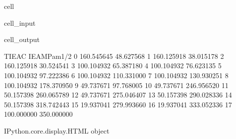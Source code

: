 \documentclass[letterpaper,10pt,english]{jupyterBook}
\begin{document}
\begin{sphinxuseclass}{cell}
\begin{sphinxVerbatimInput}
\begin{sphinxuseclass}{cell_input}
		\end{sphinxuseclass}\end{sphinxVerbatimInput}
		\begin{sphinxVerbatimOutput}
			
			\begin{sphinxuseclass}{cell_output}
				\begin{sphinxVerbatim}[commandchars=\\\{\}]
					T\PYGZus{}IEAC  IEAMPam\PYGZca{}1/2
					0  \PYGZhy{}160.545645    48.627568
					1  \PYGZhy{}160.125918    38.015178
					2  \PYGZhy{}160.125918    30.524541
					3  \PYGZhy{}100.104932    65.387180
					4  \PYGZhy{}100.104932    76.623135
					5  \PYGZhy{}100.104932    97.222386
					6  \PYGZhy{}100.104932   110.331000
					7  \PYGZhy{}100.104932   130.930251
					8  \PYGZhy{}100.104932   178.370950
					9   \PYGZhy{}49.737671    97.768005
					10  \PYGZhy{}49.737671   246.956520
					11  \PYGZhy{}50.157398   260.065789
					12  \PYGZhy{}49.737671   275.046407
					13  \PYGZhy{}50.157398   290.028336
					14  \PYGZhy{}50.157398   318.742443
					15  \PYGZhy{}19.937041   279.993660
					16  \PYGZhy{}19.937041   333.052336
					17  100.000000   350.000000
				\end{sphinxVerbatim}
				
				\begin{sphinxVerbatim}[commandchars=\\\{\}]
					\PYGZlt{}IPython.core.display.HTML object\PYGZgt{}
				\end{sphinxVerbatim}
				
				\sphinxAtStartPar
				

\end{sphinxuseclass}
\end{sphinxVerbatimOutput}
\end{sphinxuseclass}
\end{document}
